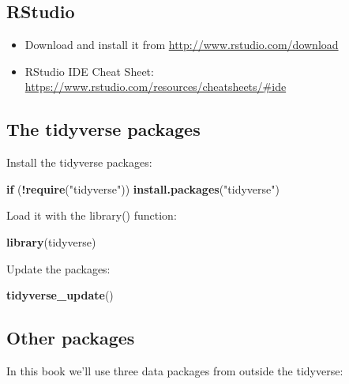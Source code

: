 \documentclass[]{book}
\newenvironment{Shaded}{\begin{snugshade}}{\end{snugshade}}
\newcommand{\ControlFlowTok}[1]{\textcolor[rgb]{0.13,0.29,0.53}{\textbf{#1}}}
\newcommand{\KeywordTok}[1]{\textcolor[rgb]{0.13,0.29,0.53}{\textbf{#1}}}
\newcommand{\NormalTok}[1]{#1}
\newcommand{\OperatorTok}[1]{\textcolor[rgb]{0.81,0.36,0.00}{\textbf{#1}}}
\newcommand{\StringTok}[1]{\textcolor[rgb]{0.31,0.60,0.02}{#1}}
\providecommand{\tightlist}{%
  \setlength{\itemsep}{0pt}\setlength{\parskip}{0pt}}
\begin{document}
\hypertarget{rstudio}{%
\subsection{RStudio}\label{rstudio}}

\begin{itemize}
\tightlist
\item
  Download and install it from \url{http://www.rstudio.com/download}
\item
  RStudio IDE Cheat Sheet: \url{https://www.rstudio.com/resources/cheatsheets/\#ide}
\end{itemize}

\hypertarget{the-tidyverse-packages}{%
\subsection{The tidyverse packages}\label{the-tidyverse-packages}}

Install the tidyverse packages:

\begin{Shaded}
\begin{Highlighting}[]
\ControlFlowTok{if}\NormalTok{ (}\OperatorTok{!}\KeywordTok{require}\NormalTok{(}\StringTok{"tidyverse"}\NormalTok{)) }\KeywordTok{install.packages}\NormalTok{(}\StringTok{"tidyverse"}\NormalTok{)}
\end{Highlighting}
\end{Shaded}

Load it with the library() function:

\begin{Shaded}
\begin{Highlighting}[]
\KeywordTok{library}\NormalTok{(tidyverse)}
\end{Highlighting}
\end{Shaded}

Update the packages:

\begin{Shaded}
\begin{Highlighting}[]
\KeywordTok{tidyverse_update}\NormalTok{()}
\end{Highlighting}
\end{Shaded}

\hypertarget{other-packages}{%
\subsection{Other packages}\label{other-packages}}

In this book we'll use three data packages from outside the tidyverse:
\end{document}
